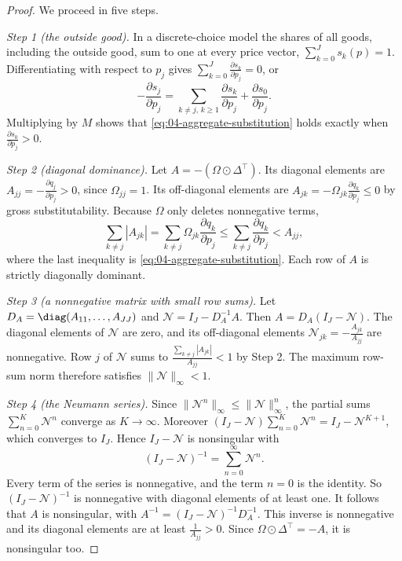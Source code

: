 \begin{proof}
We proceed in five steps.

\emph{Step 1 (the outside good).} In a discrete-choice model the shares of all goods, including the outside good,
sum to one at every price vector, $\sum_{k = 0}^{J}s_k(p) = 1$. Differentiating with respect to $p_j$ gives
$\sum_{k = 0}^{J}\frac{\partial s_k}{\partial p_j} = 0$, or
\begin{equation*}
-\frac{\partial s_j}{\partial p_j} = \sum_{k \ne j,\, k \ge 1}\frac{\partial s_k}{\partial p_j} + \frac{\partial s_0}{\partial p_j}.
\end{equation*}
Multiplying by $M$ shows that \eqref{eq:04-aggregate-substitution} holds exactly when
$\frac{\partial s_0}{\partial p_j} > 0$.

\emph{Step 2 (diagonal dominance).} Let $A = -(\Omega \odot \Delta^\top)$. Its diagonal elements are
$A_{jj} = -\frac{\partial q_j}{\partial p_j} > 0$, since $\Omega_{jj} = 1$. Its off-diagonal elements are
$A_{jk} = -\Omega_{jk}\frac{\partial q_k}{\partial p_j} \le 0$ by gross substitutability. Because $\Omega$ only
deletes nonnegative terms,
\begin{equation*}
\sum_{k \ne j}|A_{jk}| = \sum_{k \ne j}\Omega_{jk}\frac{\partial q_k}{\partial p_j}
\le \sum_{k \ne j}\frac{\partial q_k}{\partial p_j} < A_{jj},
\end{equation*}
where the last inequality is \eqref{eq:04-aggregate-substitution}. Each row of $A$ is strictly diagonally
dominant.

\emph{Step 3 (a nonnegative matrix with small row sums).} Let $D_A = \diag(A_{11}, \dots, A_{JJ})$ and
$\mathcal{N} = I_J - D_A^{-1}A$. Then $A = D_A(I_J - \mathcal{N})$. The diagonal elements of $\mathcal{N}$ are zero, and its off-diagonal
elements $\mathcal{N}_{jk} = -\frac{A_{jk}}{A_{jj}}$ are nonnegative. Row $j$ of $\mathcal{N}$ sums to
$\frac{\sum_{k \ne j}|A_{jk}|}{A_{jj}} < 1$ by Step 2. The maximum row-sum norm therefore satisfies
$\|\mathcal{N}\|_\infty < 1$.

\emph{Step 4 (the Neumann series).} Since $\|\mathcal{N}^n\|_\infty \le \|\mathcal{N}\|_\infty^n$, the partial sums
$\sum_{n = 0}^{K}\mathcal{N}^n$ converge as $K \to \infty$. Moreover
$(I_J - \mathcal{N})\sum_{n = 0}^{K}\mathcal{N}^n = I_J - \mathcal{N}^{K+1}$, which converges to $I_J$. Hence $I_J - \mathcal{N}$ is nonsingular with
\begin{equation*}
(I_J - \mathcal{N})^{-1} = \sum_{n = 0}^{\infty}\mathcal{N}^n.
\end{equation*}
Every term of the series is nonnegative, and the term $n = 0$ is the identity. So $(I_J - \mathcal{N})^{-1}$ is
nonnegative with diagonal elements of at least one. It follows that $A$ is nonsingular, with
$A^{-1} = (I_J - \mathcal{N})^{-1}D_A^{-1}$. This inverse is nonnegative and its diagonal elements are at least
$\frac{1}{A_{jj}} > 0$. Since $\Omega \odot \Delta^\top = -A$, it is nonsingular too.


\end{proof}
